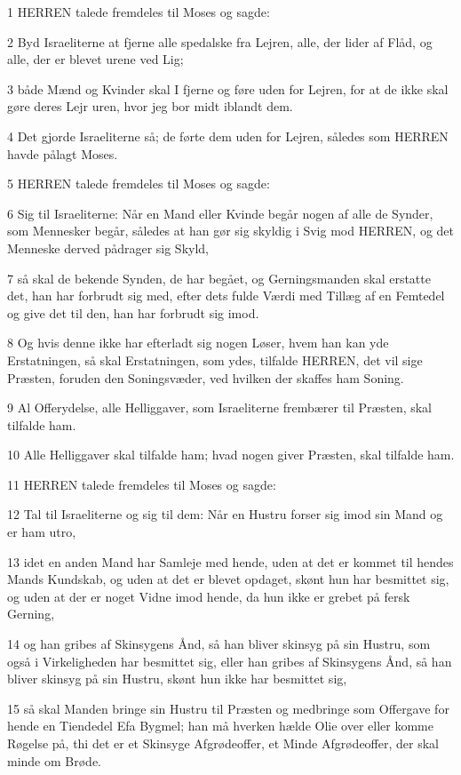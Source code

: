 \par 1 HERREN talede fremdeles til Moses og sagde:
\par 2 Byd Israeliterne at fjerne alle spedalske fra Lejren, alle, der lider af Flåd, og alle, der er blevet urene ved Lig;
\par 3 både Mænd og Kvinder skal I fjerne og føre uden for Lejren, for at de ikke skal gøre deres Lejr uren, hvor jeg bor midt iblandt dem.
\par 4 Det gjorde Israeliterne så; de førte dem uden for Lejren, således som HERREN havde pålagt Moses.
\par 5 HERREN talede fremdeles til Moses og sagde:
\par 6 Sig til Israeliterne: Når en Mand eller Kvinde begår nogen af alle de Synder, som Mennesker begår, således at han gør sig skyldig i Svig mod HERREN, og det Menneske derved pådrager sig Skyld,
\par 7 så skal de bekende Synden, de har begået, og Gerningsmanden skal erstatte det, han har forbrudt sig med, efter dets fulde Værdi med Tillæg af en Femtedel og give det til den, han har forbrudt sig imod.
\par 8 Og hvis denne ikke har efterladt sig nogen Løser, hvem han kan yde Erstatningen, så skal Erstatningen, som ydes, tilfalde HERREN, det vil sige Præsten, foruden den Soningsvæder, ved hvilken der skaffes ham Soning.
\par 9 Al Offerydelse, alle Helliggaver, som Israeliterne frembærer til Præsten, skal tilfalde ham.
\par 10 Alle Helliggaver skal tilfalde ham; hvad nogen giver Præsten, skal tilfalde ham.
\par 11 HERREN talede fremdeles til Moses og sagde:
\par 12 Tal til Israeliterne og sig til dem: Når en Hustru forser sig imod sin Mand og er ham utro,
\par 13 idet en anden Mand har Samleje med hende, uden at det er kommet til hendes Mands Kundskab, og uden at det er blevet opdaget, skønt hun har besmittet sig, og uden at der er noget Vidne imod hende, da hun ikke er grebet på fersk Gerning,
\par 14 og han gribes af Skinsygens Ånd, så han bliver skinsyg på sin Hustru, som også i Virkeligheden har besmittet sig, eller han gribes af Skinsygens Ånd, så han bliver skinsyg på sin Hustru, skønt hun ikke har besmittet sig,
\par 15 så skal Manden bringe sin Hustru til Præsten og medbringe som Offergave for hende en Tiendedel Efa Bygmel; han må hverken hælde Olie over eller komme Røgelse på, thi det er et Skinsyge Afgrødeoffer, et Minde Afgrødeoffer, der skal minde om Brøde.
